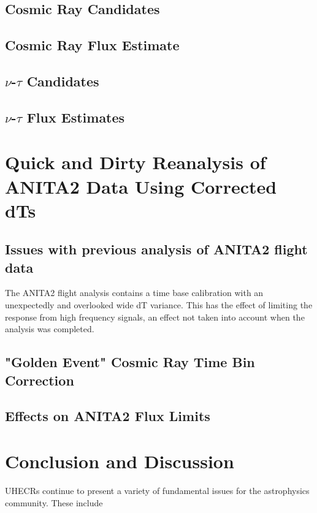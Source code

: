 \section{Cosmic Ray Candidates}

\section{Cosmic Ray Flux Estimate}

\section{$\nu$-$\tau$ Candidates}

\section{$\nu$-$\tau$ Flux Estimates}

			
\chapter{Quick and Dirty Reanalysis of ANITA2 Data Using Corrected dTs}
\section{Issues with previous analysis of ANITA2 flight data}
	The ANITA2 flight analysis contains a time base calibration with an unexpectedly and overlooked wide dT variance.  This has the effect of limiting the response from high frequency signals, an effect not taken into account when the analysis was completed.

\section{"Golden Event" Cosmic Ray Time Bin Correction}

\section{Effects on ANITA2 Flux Limits}
			
			
\chapter{Conclusion and Discussion}
	UHECRs continue to present a variety of fundamental issues for the astrophysics community.  These include 
